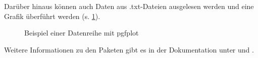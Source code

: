 \noindent Darüber hinaus können auch Daten aus .txt-Dateien ausgelesen werden und eine Grafik überführt werden (s. \cref{fig:pgfplotsexampledata}).

\begin{figure}[!ht]
    \centering
    \begin{minipage}[t]{0.95\textwidth}
        \centering
        \caption{Beispiel einer Datenreihe mit pgfplot}
        \label{fig:pgfplotsexampledata} %
    \end{minipage}
\end{figure}

\noindent Weitere Informationen zu den Paketen gibt es in der Dokumentation unter \cite{tikz} und \cite{pgfplots}.